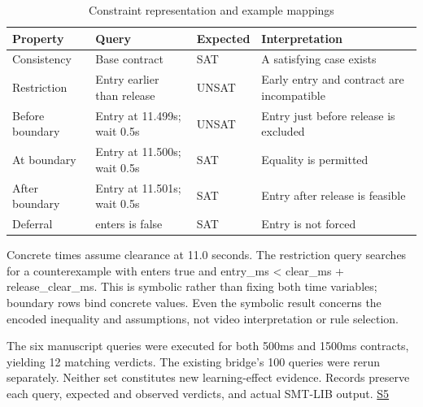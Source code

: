 \documentclass[nolineno]{ieeeaccess}
\begin{document}
\begin{table}[tp]\caption{Constraint representation and example mappings}
\centering\fontsize{8}{10}\selectfont\setlength{\tabcolsep}{3pt}
\begin{tabular}{@{}>{\raggedright\arraybackslash}p{}>{\raggedright\arraybackslash}p{}>{\raggedright\arraybackslash}p{}>{\raggedright\arraybackslash}p{}@{}}
\toprule
\textbf{Property} & \textbf{Query} & \textbf{Expected} & \textbf{Interpretation}\\
\midrule
Consistency & Base contract & SAT & A satisfying case exists\\[3pt]
Restriction & Entry earlier than release & UNSAT & Early entry and contract are incompatible\\[3pt]
Before boundary & Entry at 11.499s; wait 0.5s & UNSAT & Entry just before release is excluded\\[3pt]
At boundary & Entry at 11.500s; wait 0.5s & SAT & Equality is permitted\\[3pt]
After boundary & Entry at 11.501s; wait 0.5s & SAT & Entry after release is feasible\\[3pt]
Deferral & enters is false & SAT & Entry is not forced\\[3pt]
\bottomrule\end{tabular}
\end{table}

Concrete times assume clearance at 11.0 seconds. The restriction query searches for a counterexample with {\ttfamily{}\selectfont\footnotesize enters} true and {\ttfamily{}\selectfont\footnotesize entry\_\allowbreak ms < clear\_\allowbreak ms + release\_\allowbreak clear\_\allowbreak ms}. This is symbolic rather than fixing both time variables; boundary rows bind concrete values. Even the symbolic result concerns the encoded inequality and assumptions, not video interpretation or rule selection.\par

The six manuscript queries were executed for both 500ms and 1500ms contracts, yielding 12 matching verdicts. The existing bridge's 100 queries were rerun separately. Neither set constitutes new learning-effect evidence. Records preserve each query, expected and observed verdicts, and actual SMT-LIB output. \href{\detokenize{/home/jinhyun/prj_ws/prj_jin/guardsynth-cc/artifacts/projects/guardsynth-coc/public/paper1-method-preservation-001/methodology-2026-09-30-001/manuscript_examples.json}}{S5}\par
\end{document}

